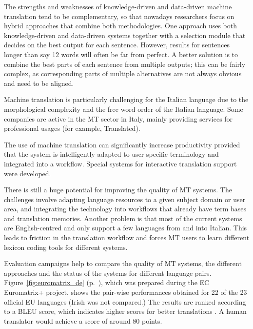 \begin{multicols}{2}
The strengths and weaknesses of knowledge-driven and data-driven machine translation tend to be complementary, so that nowadays researchers focus on hybrid approaches that combine both methodologies. One approach uses both knowledge-driven and data-driven systems together with a selection module that decides on the best output for each sentence. However, results for sentences longer than say 12 words will often be far from perfect. A better solution is to combine the best parts of each sentence from multiple outputs; this can be fairly complex, as corresponding parts of multiple alternatives are not always obvious and need to be aligned. 


Machine translation is particularly challenging for the Italian language due to the morphological complexity and the free word order of the Italian language. Some companies are active in the MT sector in Italy, mainly providing services for professional usages (for example, Translated).

The use of machine translation can significantly increase productivity
provided that the system is intelligently adapted to user-specific terminology
and integrated into a workflow. Special systems for interactive translation
support were developed.

There is still a huge potential for improving the quality of MT systems. The challenges involve adapting language resources to a given subject domain or user area, and integrating the technology into workflows that already have term bases and translation memories. Another problem is that most of the current systems are English-centred and only support a few languages from and into Italian. This leads to friction in the translation workflow and forces MT users to learn different lexicon coding tools for different systems.

Evaluation campaigns help to compare the quality of MT systems, the different approaches and the status of the systems for different language pairs. Figure~\ref{fig:euromatrix_de} (p.~\pageref{fig:euromatrix_de}), which was prepared during the EC Euromatrix+ project, shows the pair-wise performances obtained for 22 of the 23 official EU languages (Irish was not compared.) The results are ranked according to a BLEU score, which indicates higher scores for better translations \cite{bleu1}. A human translator would achieve a score of around 80 points. 


\end{multicols}
